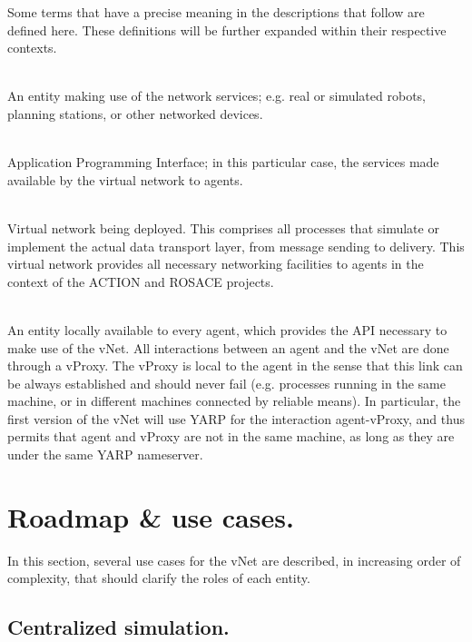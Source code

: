 \documentclass[a4paper,11pt]{article}
\begin{document}
Some terms that have a precise meaning in the descriptions that follow are defined here. These definitions will be further expanded within their respective contexts.

\begin{description}
    \newcommand{\define}[2]{\item[#1:]\hfill\\#2.}
    
    \define{Agent}{An entity making use of the network services; e.g. real or simulated robots, planning stations, or other networked devices}
    
    \define{API}{Application Programming Interface; in this particular case, the services made available by the virtual network to agents}
    
    \define{vNet}{Virtual network being deployed. This comprises all processes that simulate or implement the actual data transport layer, from message sending to delivery. This virtual network provides all necessary networking facilities to agents in the context of the ACTION and ROSACE projects}
    
    \define{vProxy}{An entity locally available to every agent, which provides the API necessary to make use of the vNet. All interactions between an agent and the vNet are done through a vProxy. The vProxy is local to the agent in the sense that this link can be always established and should never fail (e.g. processes running in the same machine, or in different machines connected by reliable means). In particular, the first version of the vNet will use YARP for the interaction agent-vProxy, and thus permits that agent and vProxy are not in the same machine, as long as they are under the same YARP nameserver}
    
    
\end{description}

\section{Roadmap \& use cases.}

In this section, several use cases for the vNet are described, in increasing order of complexity, that should clarify the roles of each entity.

\subsection{Centralized simulation.}
\end{document}
